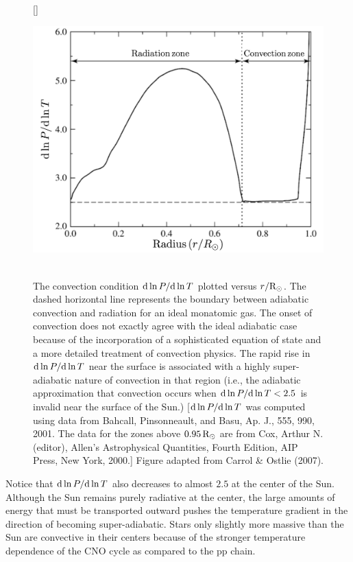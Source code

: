 \documentclass[a4paper,10pt]{article}
\begin{document}
\begin{figure}[h]
    [\FBwidth]
    {\caption{\footnotesize{\\The convection condition ${\rm d}\ln P/{\rm d}\ln T$ plotted versus $r/{\rm R_\odot}$. The dashed horizontal line represents the boundary between adiabatic convection and radiation for an ideal monatomic gas. The onset of convection does not exactly agree with the ideal adiabatic case because of the incorporation of a sophisticated equation of state and a more detailed treatment of convection physics. The rapid rise in ${\rm d}\ln P/{\rm d}\ln T$ near the surface is associated with a highly super-adiabatic nature of convection in that region (i.e., the adiabatic approximation that convection occurs when ${\rm d}\ln P/{\rm d}\ln T<2.5$ is invalid near the surface of the Sun.) [${\rm d}\ln P/{\rm d}\ln T$ was computed using data from Bahcall, Pinsonneault, and Basu, Ap. J., 555, 990, 2001. The data for the zones above $0.95\,{\rm R_\odot}$ are from Cox, Arthur N. (editor), Allen's Astrophysical Quantities, Fourth Edition, AIP Press, New York, 2000.] Figure adapted from Carrol \& Ostlie (2007).}}
    \label{fig:solarconvection}}
    {\includegraphics[width=12cm]{figures/SolarConvection.png}}
\end{figure}

{\noindent}Notice that ${\rm d}\ln P/{\rm d}\ln T$ also decreases to almost $2.5$ at the center of the Sun. Although the Sun remains purely radiative at the center, the large amounts of energy that must be transported outward pushes the temperature gradient in the direction of becoming super-adiabatic. Stars only slightly more massive than the Sun are convective in their centers because of the stronger temperature dependence of the CNO cycle as compared to the pp chain. 
\end{document}
